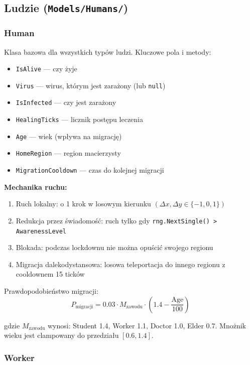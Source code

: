 \documentclass[a4paper,12pt]{article}
\begin{document}
\subsection{Ludzie (\texttt{Models/Humans/})}

\subsubsection{Human}

Klasa bazowa dla wszystkich typów ludzi. Kluczowe pola i metody:

\begin{itemize}
    \item \texttt{IsAlive} --- czy żyje
    \item \texttt{Virus} --- wirus, którym jest zarażony (lub \texttt{null})
    \item \texttt{IsInfected} --- czy jest zarażony
    \item \texttt{HealingTicks} --- licznik postępu leczenia
    \item \texttt{Age} --- wiek (wpływa na migrację)
    \item \texttt{HomeRegion} --- region macierzysty
    \item \texttt{MigrationCooldown} --- czas do kolejnej migracji
\end{itemize}

\textbf{Mechanika ruchu:}
\begin{enumerate}
    \item Ruch lokalny: o 1 krok w losowym kierunku $(\Delta x, \Delta y \in \{-1,0,1\})$
    \item Redukcja przez świadomość: ruch tylko gdy \texttt{rng.NextSingle() > AwarenessLevel}
    \item Blokada: podczas lockdownu nie można opuścić swojego regionu
    \item Migracja dalekodystansowa: losowa teleportacja do innego regionu z cooldownem 15 ticków
\end{enumerate}

Prawdopodobieństwo migracji:
\[
P_{\text{migracji}} = 0.03 \cdot M_{\text{zawodu}} \cdot \left(1.4 - \frac{\text{Age}}{100}\right)
\]

gdzie $M_{\text{zawodu}}$ wynosi: Student 1.4, Worker 1.1, Doctor 1.0, Elder 0.7.
Mnożnik wieku jest clampowany do przedziału $[0.6, 1.4]$.

\subsubsection{Worker}
\end{document}
